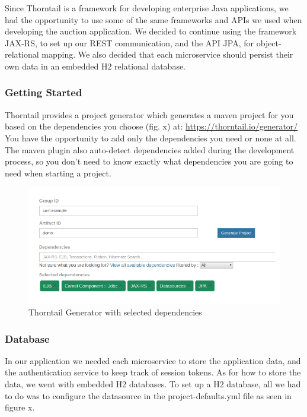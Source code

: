 \noindent Since Thorntail is a framework for developing enterprise Java applications, we had the opportunity to use some of the same frameworks and APIs we used when developing the auction application. We decided to continue using the framework JAX-RS, to set up our REST communication, and the API JPA, for object-relational mapping. We also decided that each microservice should persist their own data in an embedded H2 relational database. 


\subsubsection{Getting Started}
Thorntail provides a project generator which generates a maven project for you based on the dependencies you choose (fig. x) at: \hyperref[https://thorntail.io/generator/]{https://thorntail.io/generator/} \\

\noindent You have the opportunity to add only the dependencies you need or none at all. The maven plugin also auto-detect dependencies added during the development process, so you don’t need to know exactly what dependencies you are going to need when starting a project.

\begin{figure}[ht]
  \centering
  \includegraphics[scale=0.7]{figs/thorntailgenerator.png}
  \caption{Thorntail Generator with selected dependencies}
  \label{fig:thorntailgenerator}
\end{figure}

\subsubsection{Database}
In our application we needed each microservice to store the application data, and the authentication service to keep track of session tokens. As for how to store the data, we went with embedded H2 databases. To set up a H2 database, all we had to do was to configure the datasource in the project-defaults.yml file as seen in figure x.\\

